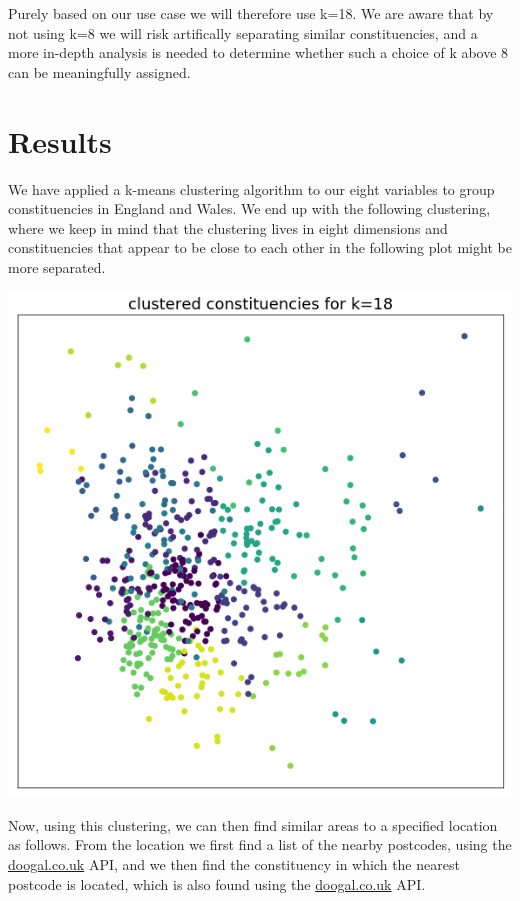 \documentclass[a4paper, 11pt]{article}
\begin{document}
Purely based on our use case we will therefore use k=18. We are aware that by not using k=8 we will risk artifically separating similar constituencies, and a more in-depth analysis is needed to determine whether such a choice of k above 8 can be meaningfully assigned.

\section{Results}
We have applied a k-means clustering algorithm to our eight variables to group constituencies in England and Wales. We end up with the following clustering, where we keep in mind that the clustering lives in eight dimensions and constituencies that appear to be close to each other in the following plot might be more separated.

\begin{center}
  \includegraphics[scale=.40]{../gfx/cluster_colour.png}
\end{center}

Now, using this clustering, we can then find similar areas to a specified location as follows. From the location we first find a list of the nearby postcodes, using the \url{doogal.co.uk} API, and we then find the constituency in which the nearest postcode is located, which is also found using the \url{doogal.co.uk} API.
\end{document}
